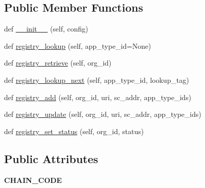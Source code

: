 \subsection*{Public Member Functions}
\begin{DoxyCompactItemize}
\item 
def \hyperlink{classavalon__sdk_1_1connector_1_1blockchains_1_1fabric_1_1fabric__worker__registry__list_1_1FabricWorkerRegistryListImpl_ace1cb09517b31bff250580f6c83bf910}{\+\_\+\+\_\+init\+\_\+\+\_\+} (self, config)
\item 
def \hyperlink{classavalon__sdk_1_1connector_1_1blockchains_1_1fabric_1_1fabric__worker__registry__list_1_1FabricWorkerRegistryListImpl_abfe489588b14d03f94d7578a6fd978df}{registry\+\_\+lookup} (self, app\+\_\+type\+\_\+id=None)
\item 
def \hyperlink{classavalon__sdk_1_1connector_1_1blockchains_1_1fabric_1_1fabric__worker__registry__list_1_1FabricWorkerRegistryListImpl_af289a41194089f586f042d69239b7a26}{registry\+\_\+retrieve} (self, org\+\_\+id)
\item 
def \hyperlink{classavalon__sdk_1_1connector_1_1blockchains_1_1fabric_1_1fabric__worker__registry__list_1_1FabricWorkerRegistryListImpl_ace64bb5dd5c8a067d11b508475ef7262}{registry\+\_\+lookup\+\_\+next} (self, app\+\_\+type\+\_\+id, lookup\+\_\+tag)
\item 
def \hyperlink{classavalon__sdk_1_1connector_1_1blockchains_1_1fabric_1_1fabric__worker__registry__list_1_1FabricWorkerRegistryListImpl_aaaac89bf24d002135123fda28683c5f5}{registry\+\_\+add} (self, org\+\_\+id, uri, sc\+\_\+addr, app\+\_\+type\+\_\+ids)
\item 
def \hyperlink{classavalon__sdk_1_1connector_1_1blockchains_1_1fabric_1_1fabric__worker__registry__list_1_1FabricWorkerRegistryListImpl_a1169f977e01dcaa0875a2152a14a5ec7}{registry\+\_\+update} (self, org\+\_\+id, uri, sc\+\_\+addr, app\+\_\+type\+\_\+ids)
\item 
def \hyperlink{classavalon__sdk_1_1connector_1_1blockchains_1_1fabric_1_1fabric__worker__registry__list_1_1FabricWorkerRegistryListImpl_ae5a9a5c72ce6cfc24bc56eb36492ac72}{registry\+\_\+set\+\_\+status} (self, org\+\_\+id, status)
\end{DoxyCompactItemize}
\subsection*{Public Attributes}
\begin{DoxyCompactItemize}
\item 
\mbox{\label{classavalon__sdk_1_1connector_1_1blockchains_1_1fabric_1_1fabric__worker__registry__list_1_1FabricWorkerRegistryListImpl_aeee60bea5f975b58c8d337f76663b591}} 
{\bfseries C\+H\+A\+I\+N\+\_\+\+C\+O\+DE}
\end{DoxyCompactItemize}


